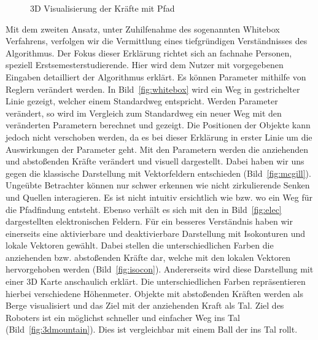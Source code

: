 \begin{figure}[ht!]
  \centering
  \caption{3D Visualisierung der Kräfte mit Pfad}
  \label{fig:3dmountain}
\end{figure}

Mit dem zweiten Ansatz, unter Zuhilfenahme des sogenannten Whitebox Verfahrens, verfolgen wir die Vermittlung eines tiefgründigen Verständnisses des Algorithmus. Der Fokus dieser Erklärung richtet sich an fachnahe Personen, speziell Erstsemesterstudierende. Hier wird dem Nutzer mit vorgegebenen Eingaben detailliert der Algorithmus erklärt. Es können Parameter mithilfe von Reglern verändert werden. In Bild~\vref{fig:whitebox} wird ein Weg in gestrichelter Linie gezeigt, welcher einem Standardweg entspricht.
Werden Parameter verändert, so wird im Vergleich zum Standardweg ein neuer Weg mit den veränderten Parametern berechnet und gezeigt. Die Positionen der Objekte kann jedoch nicht verschoben werden, da es bei dieser Erklärung in erster Linie um die Auswirkungen der Parameter geht.
Mit den Parametern werden die anziehenden und abstoßenden Kräfte verändert und visuell dargestellt. Dabei haben wir uns gegen die klassische Darstellung mit Vektorfeldern entschieden (Bild~\vref{fig:mcgill}). Ungeübte Betrachter können nur schwer erkennen wie  nicht zirkulierende Senken und Quellen \cite{munzner2015visualization} interagieren. Es ist nicht intuitiv ersichtlich wie bzw. wo ein Weg für die Pfadfindung entsteht. Ebenso  verhält es sich mit den in Bild~\vref{fig:elec} dargestellten elektronischen Feldern. Für ein besseres Verständnis haben wir  einerseits eine aktivierbare und deaktivierbare Darstellung mit Isokonturen \cite{munzner2015visualization} und lokale Vektoren gewählt. Dabei stellen die unterschiedlichen Farben die anziehenden bzw. abstoßenden Kräfte dar, welche mit den lokalen Vektoren hervorgehoben werden (Bild~\vref{fig:isocon}). Andererseits wird diese Darstellung mit einer 3D Karte anschaulich erklärt. Die unterschiedlichen Farben repräsentieren hierbei verschiedene Höhenmeter. Objekte mit abstoßenden Kräften werden als Berge visualisiert und das Ziel mit der anziehenden Kraft als Tal. Ziel des Roboters ist ein möglichst schneller und einfacher Weg ins Tal (Bild~\vref{fig:3dmountain}). Dies ist vergleichbar mit einem Ball der ins Tal rollt.



